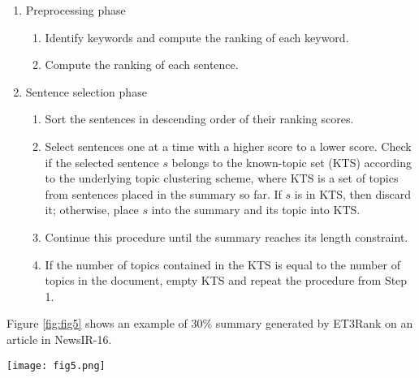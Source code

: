 \documentclass[a4paper,twoside]{article}
\begin{document}
\vspace*{-2pt}
\begin{enumerate}
\item Preprocessing phase
\begin{enumerate}
\vspace*{-1pt}\item Identify keywords and compute the ranking of each keyword.
\vspace*{-1pt}\item Compute the ranking of each sentence.
\end{enumerate}
\vspace*{-2mm}
\item Sentence selection phase
\begin{enumerate}
\vspace*{-1pt}\item Sort the sentences in descending order of their ranking scores. %

\vspace*{-1pt}\item Select sentences one at a time with a higher score to a lower score.
Check if the selected sentence $s$ belongs to the known-topic set (KTS) according to the underlying
topic clustering scheme, where KTS is a set of topics from sentences placed in the summary so far. If $s$ is in KTS, then discard it; otherwise, place $s$ into the summary and its topic into KTS.
\vspace*{-1pt}\item Continue this procedure until the summary reaches its length constraint.

\vspace*{-1pt}\item If the number of topics contained in the KTS is equal to the number of topics in the document,
empty KTS and repeat the procedure from Step 1. %
\end{enumerate}
\end{enumerate}


Figure \ref{fig:fig5} shows an example of 30\% summary generated by ET3Rank on an article in NewsIR-16.
\begin{figure*}[t]
\texttt{[image: fig5.png]}
\caption{An example of 30\% summary of an article in NewsIR-16 by ET3Rank, where the
original document is on the left and the summary is on the right.}
\label{fig:fig5}
\end{figure*}
\end{document}
